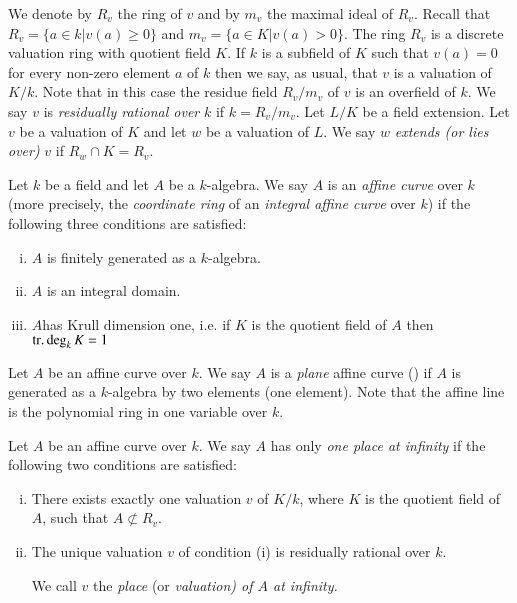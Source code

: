 We denote by $R_v$ the ring of $v$ and by $m_v$ the maximal ideal of
$R_v$. Recall that $R_v= \{ a \in k| v(a) \geq 0 \}$ and $m_v = \{ a
\in K| v(a) > 0\}$. The ring $R_v$ is a discrete valuation ring with
quotient field $K$. If $k$ is a subfield of $K$ such that $v(a)=0$ for
every non-zero element $a$ of $k$ then we say, as usual, that $v$ is a
valuation of $K/k$. Note that in this case the residue field $R_v/m_v$
of $v$ is an overfield of $k$. We say $v$ is {\em residually rational
  over} $k$ if $k= R_v/m_v$. Let $L/K$ be a field extension. Let $v$
be a valuation of $K$ and let $w$ be a valuation of $L$. We say $w$
{\em extends (or lies over)} $v$ if $R_w \cap K= R_v$.

\setcounter{thm}{1}
\begin{defi}\label{part1:chap4:sec11:def11.2}
  Let $k$ be a field and let $A$ be a $k$-algebra. We say $A$ is an
  {\em affine curve} over $k$ (more precisely, the {\em coordinate
    ring} of an {\em integral affine curve} over $k$) if the following
  three conditions are satisfied:
\begin{enumerate}[(i)]
\item $A$ is finitely generated as a $k$-algebra.
\item $A$ is an integral domain.
\item $A$\pageoriginale has Krull dimension one, i.e. if $K$ is the quotient field
  of $A$ then $\operatorname{tr.} \deg_k K=1$
\end{enumerate}
\end{defi}

\begin{defi}\label{part1:chap4:sec11:def11.3}
  Let $A$ be an affine curve over $k$. We say $A$ is a {\em plane}
  affine curve () if $A$ is generated as a
  $k$-algebra by two elements (\resp one element). Note that the
  affine line is the polynomial ring in one variable over $k$.
\end{defi}

\begin{defi}\label{part1:chap4:sec11:def11.4}
  Let $A$ be an affine curve over $k$. We say $A$ has only {\em one
    place at infinity} if the following two conditions are satisfied:
  \begin{enumerate}[(i)]
  \item There exists exactly one valuation $v$ of $K/k$, where $K$ is
    the quotient field of $A$, such that $A \nsubset R_v$.
    \item The unique valuation $v$ of condition (i)
      is residually rational over $k$. 

      We call $v$ the {\em place} (or \em{valuation}) of $A$ {\em at
        infinity}.
  \end{enumerate}
\end{defi}

